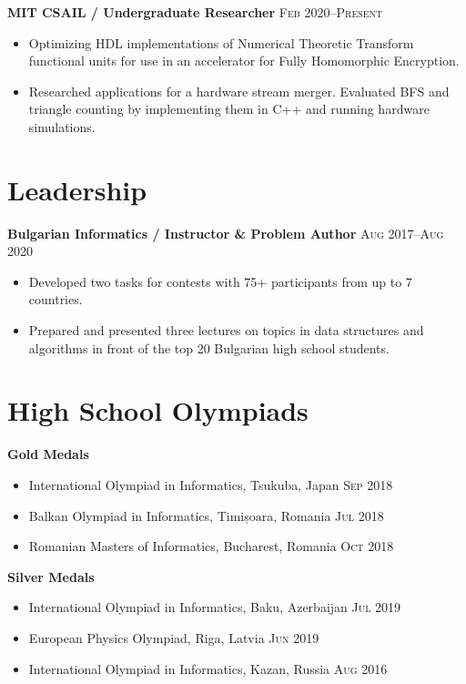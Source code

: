 \documentclass[letterpaper,11pt]{article}
\begin{document}
\textbf{MIT CSAIL / Undergraduate Researcher}
\hfill
\textsc{Feb 2020--Present}
\begin{itemize}
    \item Optimizing HDL implementations of Numerical Theoretic Transform
        functional units for use in an accelerator for Fully Homomorphic
        Encryption.
    \item Researched applications for a hardware stream merger. Evaluated BFS
        and triangle counting by implementing them in C++ and running hardware
        simulations.
\end{itemize}

\section*{Leadership}
\textbf{Bulgarian Informatics / Instructor \& Problem Author}
\hfill
\textsc{Aug 2017--Aug 2020}
\begin{itemize}
    \item Developed two tasks for contests with 75+ participants from up to 7
        countries.
    \item Prepared and presented three lectures on topics in data structures and
        algorithms in front of the top 20 Bulgarian high school students.
\end{itemize}

\section*{High School Olympiads}
\textbf{Gold Medals}
\begin{itemize}
    \item International Olympiad in Informatics, Tsukuba, Japan
        \hfill \textsc{Sep 2018}
    \item Balkan Olympiad in Informatics, Timișoara, Romania
        \hfill \textsc{Jul 2018}
    \item Romanian Masters of Informatics, Bucharest, Romania
        \hfill \textsc{Oct 2018}
\end{itemize}

\textbf{Silver Medals}
\begin{itemize}
    \item International Olympiad in Informatics, Baku, Azerbaijan
        \hfill \textsc{Jul 2019}
    \item European Physics Olympiad, Riga, Latvia
        \hfill \textsc{Jun 2019}
    \item International Olympiad in Informatics, Kazan, Russia
        \hfill \textsc{Aug 2016}
\end{itemize}
\end{document}
